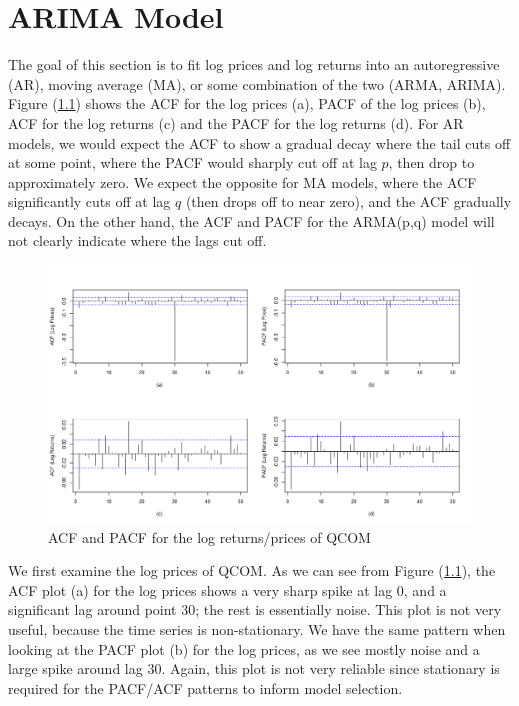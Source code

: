 \chapter{ARIMA Model}

The goal of this section is to fit log prices and log returns into an autoregressive (AR), moving average (MA), or some combination of the two (ARMA, ARIMA). Figure (\ref{fig:acf_pacf_log_price_returns}) shows the ACF for the log prices (a), PACF of the log prices (b), ACF for the log returns (c) and the PACF for the log returns (d). For AR models, we would expect the ACF to show a gradual decay where the tail cuts off at some point, where the PACF would sharply cut off at lag $p$, then drop to approximately zero. We expect the opposite for MA models, where the ACF significantly cuts off at lag $q$ (then drops off to near zero), and the ACF gradually decays. On the other hand, the ACF and PACF for the ARMA(p,q) model will not clearly indicate where the lags cut off. 

\begin{figure}[h]
	\centering
	\includegraphics[width=1\linewidth]{content/plots/acf_pacf_log_price_returns.png}
	\caption{ACF and PACF for the log returns/prices of QCOM}
	\label{fig:acf_pacf_log_price_returns}
\end{figure}

We first examine the log prices of QCOM. As we can see from Figure (\ref{fig:acf_pacf_log_price_returns}), the ACF plot (a) for the log prices shows a very sharp spike at lag 0, and a significant lag around point 30; the rest is essentially noise. This plot is not very useful, because the time series is non-stationary. We have the same pattern when looking at the PACF plot (b) for the log prices, as we see mostly noise and a large spike around lag 30. Again, this plot is not very reliable since stationary is required for the PACF/ACF patterns to inform model selection. 

